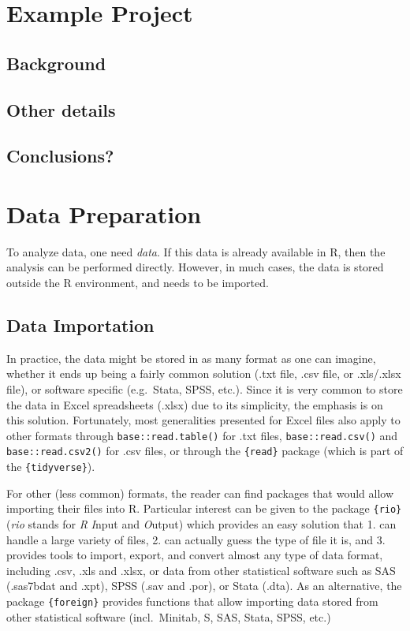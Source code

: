 \documentclass[
]{book}
\begin{document}
\hypertarget{ex_proj}{%
\chapter{Example Project}\label{ex_proj}}

\hypertarget{background}{%
\section{Background}\label{background}}

\hypertarget{other-details}{%
\section{Other details}\label{other-details}}

\hypertarget{conclusions}{%
\section{Conclusions?}\label{conclusions}}

\hypertarget{data_prep}{%
\chapter{Data Preparation}\label{data_prep}}

To analyze data, one need \emph{data}. If this data is already available in R, then the analysis can be performed directly. However, in much cases, the data is stored outside the R environment, and needs to be imported.

\hypertarget{data-importation}{%
\section{Data Importation}\label{data-importation}}

In practice, the data might be stored in as many format as one can imagine, whether it ends up being a fairly common solution (.txt file, .csv file, or .xls/.xlsx file), or software specific (e.g.~Stata, SPSS, etc.).
Since it is very common to store the data in Excel spreadsheets (.xlsx) due to its simplicity, the emphasis is on this solution. Fortunately, most generalities presented for Excel files also apply to other formats through \texttt{base::read.table()} for .txt files, \texttt{base::read.csv()} and \texttt{base::read.csv2()} for .csv files, or through the \texttt{\{read\}} package (which is part of the \texttt{\{tidyverse\}}).

For other (less common) formats, the reader can find packages that would allow importing their files into R. Particular interest can be given to the package \texttt{\{rio\}} (\emph{rio} stands for \emph{R} \emph{I}nput and \emph{O}utput) which provides an easy solution that 1. can handle a large variety of files, 2. can actually guess the type of file it is, and 3. provides tools to import, export, and convert almost any type of data format, including .csv, .xls and .xlsx, or data from other statistical software such as SAS (.sas7bdat and .xpt), SPSS (.sav and .por), or Stata (.dta). As an alternative, the package \texttt{\{foreign\}} provides functions that allow importing data stored from other statistical software (incl.~Minitab, S, SAS, Stata, SPSS, etc.)
\end{document}
